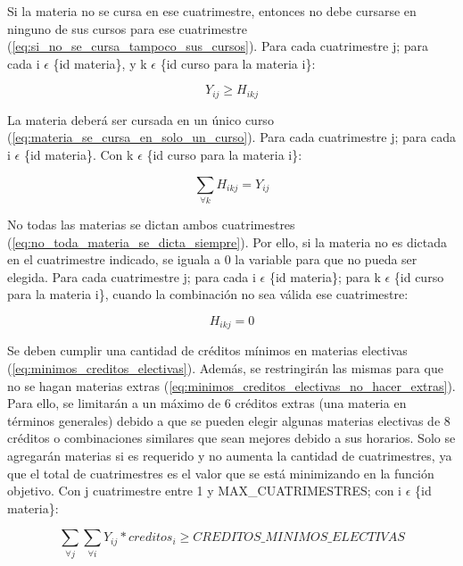 \documentclass[a4paper]{article}
\begin{document}
Si la materia no se cursa en ese cuatrimestre, entonces no debe cursarse en ninguno de sus cursos para ese cuatrimestre (\ref{eq:si_no_se_cursa_tampoco_sus_cursos}). Para cada cuatrimestre j; para cada i $\epsilon$ \{id materia\}, y k $\epsilon$ \{id curso para la materia i\}:

\begin{equation}\label{eq:si_no_se_cursa_tampoco_sus_cursos}
Y_{ij} \geq H_{ikj}
\end{equation}

La materia deberá ser cursada en un único curso (\ref{eq:materia_se_cursa_en_solo_un_curso}). Para cada cuatrimestre j; para cada i $\epsilon$ \{id materia\}. Con k $\epsilon$ \{id curso para la materia i\}:

\begin{equation}\label{eq:materia_se_cursa_en_solo_un_curso}
\sum_{\forall k} H_{ikj} = Y_{ij}
\end{equation}

No todas las materias se dictan ambos cuatrimestres (\ref{eq:no_toda_materia_se_dicta_siempre}). Por ello, si la materia no es dictada en el cuatrimestre indicado, se iguala a 0 la variable para que no pueda ser elegida. Para cada cuatrimestre j; para cada i $\epsilon$ \{id materia\}; para k $\epsilon$ \{id curso para la materia i\}, cuando la combinación no sea válida ese cuatrimestre:

\begin{equation}\label{eq:no_toda_materia_se_dicta_siempre}
H_{ikj} = 0
\end{equation}

Se deben cumplir una cantidad de créditos mínimos en materias electivas (\ref{eq:minimos_creditos_electivas}). Además, se restringirán las mismas para que no se hagan materias extras (\ref{eq:minimos_creditos_electivas_no_hacer_extras}). Para ello, se limitarán a un máximo de 6 créditos extras (una materia en términos generales) debido a que se pueden elegir algunas materias electivas de 8 créditos o combinaciones similares que sean mejores debido a sus horarios. Solo se agregarán materias si es requerido y no aumenta la cantidad de cuatrimestres, ya que el total de cuatrimestres es el valor que se está minimizando en la función objetivo. Con j cuatrimestre entre 1 y MAX\_CUATRIMESTRES; con i $\epsilon$ \{id materia\}:

\begin{equation}\label{eq:minimos_creditos_electivas}
\sum_{\forall j} \sum_{\forall i} Y_{ij} * creditos_i \geq CREDITOS\_MINIMOS\_ELECTIVAS
\end{equation}
\end{document}

